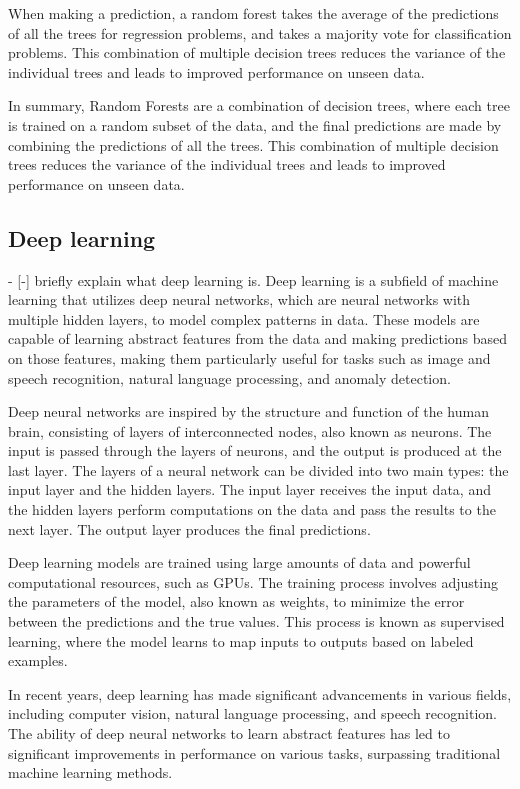 When making a prediction, a random forest takes the average of the predictions of all the trees for regression problems, and takes a majority vote for classification problems. This combination of multiple decision trees reduces the variance of the individual trees and leads to improved performance on unseen data.

In summary, Random Forests are a combination of decision trees, where each tree is trained on a random subset of the data, and the final predictions are made by combining the predictions of all the trees. This combination of multiple decision trees reduces the variance of the individual trees and leads to improved performance on unseen data.



\subsection{Deep learning}
- [-] briefly explain what deep learning is.
Deep learning is a subfield of machine learning that utilizes deep neural networks, which are neural networks with multiple hidden layers, to model complex patterns in data. These models are capable of learning abstract features from the data and making predictions based on those features, making them particularly useful for tasks such as image and speech recognition, natural language processing, and anomaly detection.

Deep neural networks are inspired by the structure and function of the human brain, consisting of layers of interconnected nodes, also known as neurons. The input is passed through the layers of neurons, and the output is produced at the last layer. The layers of a neural network can be divided into two main types: the input layer and the hidden layers. The input layer receives the input data, and the hidden layers perform computations on the data and pass the results to the next layer. The output layer produces the final predictions.

Deep learning models are trained using large amounts of data and powerful computational resources, such as GPUs. The training process involves adjusting the parameters of the model, also known as weights, to minimize the error between the predictions and the true values. This process is known as supervised learning, where the model learns to map inputs to outputs based on labeled examples.

In recent years, deep learning has made significant advancements in various fields, including computer vision, natural language processing, and speech recognition. The ability of deep neural networks to learn abstract features has led to significant improvements in performance on various tasks, surpassing traditional machine learning methods.

